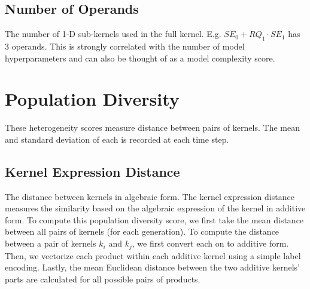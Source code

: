 \documentclass{article}
\begin{document}
\subsection{Number of Operands}
The number of 1-D sub-kernels used in the full kernel. E.g. $SE_0 + RQ_1 \cdot SE_1$ has 3 operands. This is strongly correlated with the number of model hyperparameters and can also be thought of as a model complexity score. 
\section{Population Diversity}
These heterogeneity scores measure distance between pairs of kernels.  The mean and standard deviation of each is recorded at each time step.
\subsection{Kernel Expression Distance}
The distance between kernels in algebraic form. The kernel expression distance measures the similarity based on the algebraic expression of the kernel in additive form. To compute this population diversity score, we first take the mean distance between all pairs of kernels (for each generation). To compute the distance between a pair of kernels $k_i$ and $k_j$, we first convert each on to additive form. Then, we vectorize each product within each additive kernel using a simple label encoding. Lastly, the mean Euclidean distance between the two additive kernels' parts are calculated for all possible pairs of products.
\end{document}
